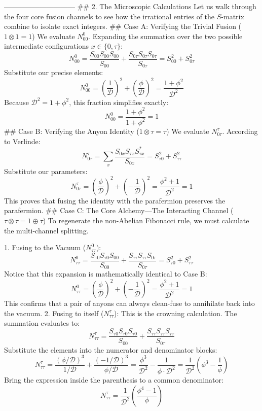 ------------------------------
## 2. The Microscopic Calculations
Let us walk through the four core fusion channels to see how the irrational entries of the $S$-matrix combine to isolate exact integers.
## Case A: Verifying the Trivial Fusion ($1 \otimes 1 = 1$)
We evaluate $N_{00}^0$. Expanding the summation over the two possible intermediate configurations $x \in \{0, \tau\}$:
$$N_{00}^0 = \frac{S_{00} S_{00} S_{00}}{S_{00}} + \frac{S_{0\tau} S_{0\tau} S_{0\tau}}{S_{0\tau}} = S_{00}^2 + S_{0\tau}^2$$ 
Substitute our precise elements:
$$N_{00}^0 = \left(\frac{1}{\mathcal{D}}\right)^2 + \left(\frac{\phi}{\mathcal{D}}\right)^2 = \frac{1 + \phi^2}{\mathcal{D}^2}$$ 
Because $\mathcal{D}^2 = 1 + \phi^2$, this fraction simplifies exactly:
$$N_{00}^0 = \frac{1 + \phi^2}{1 + \phi^2} = 1$$ 
## Case B: Verifying the Anyon Identity ($1 \otimes \tau = \tau$)
We evaluate $N_{0\tau}^\tau$. According to Verlinde:
$$N_{0\tau}^\tau = \sum_{x} \frac{S_{0x} S_{\tau x} S_{\tau x}^*}{S_{0x}} = S_{\tau 0}^2 + S_{\tau\tau}^2$$ 
Substitute our parameters:
$$N_{0\tau}^\tau = \left(\frac{\phi}{\mathcal{D}}\right)^2 + \left(-\frac{1}{\mathcal{D}}\right)^2 = \frac{\phi^2 + 1}{\mathcal{D}^2} = 1$$ 
This proves that fusing the identity with the parafermion preserves the parafermion.
## Case C: The Core Alchemy—The Interacting Channel ($\tau \otimes \tau = 1 \oplus \tau$)
To regenerate the non-Abelian Fibonacci rule, we must calculate the multi-channel splitting.

   1. Fusing to the Vacuum ($N_{\tau\tau}^0$):
   $$N_{\tau\tau}^0 = \frac{S_{\tau 0} S_{\tau 0} S_{0 0}}{S_{00}} + \frac{S_{\tau \tau} S_{\tau \tau} S_{0 \tau}}{S_{0\tau}} = S_{\tau 0}^2 + S_{\tau\tau}^2$$ 
   Notice that this expansion is mathematically identical to Case B:
   $$N_{\tau\tau}^0 = \left(\frac{\phi}{\mathcal{D}}\right)^2 + \left(-\frac{1}{\mathcal{D}}\right)^2 = \frac{\phi^2 + 1}{\mathcal{D}^2} = 1$$ 
   This confirms that a pair of anyons can always clean-fuse to annihilate back into the vacuum.
   2. Fusing to itself ($N_{\tau\tau}^\tau$):
   This is the crowning calculation. The summation evaluates to:
   $$N_{\tau\tau}^\tau = \frac{S_{\tau 0} S_{\tau 0} S_{\tau 0}}{S_{00}} + \frac{S_{\tau \tau} S_{\tau \tau} S_{\tau \tau}}{S_{0\tau}}$$ 
   Substitute the elements into the numerator and denominator blocks:
   $$N_{\tau\tau}^\tau = \frac{(\phi/\mathcal{D})^3}{1/\mathcal{D}} + \frac{(-1/\mathcal{D})^3}{\phi/\mathcal{D}} = \frac{\phi^3}{\mathcal{D}^2} - \frac{1}{\phi \cdot \mathcal{D}^2} = \frac{1}{\mathcal{D}^2} \left( \phi^3 - \frac{1}{\phi} \right)$$ 
   Bring the expression inside the parenthesis to a common denominator:
   $$N_{\tau\tau}^\tau = \frac{1}{\mathcal{D}^2} \left( \frac{\phi^4 - 1}{\phi} \right)$$ 

